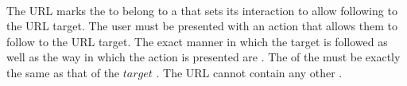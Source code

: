  \\

The URL  marks the  to belong to a  that sets its interaction to allow following to the URL target. The user must be presented with an action that allows them to follow to the URL target. The exact manner in which the target is followed as well as the way in which the action is presented are . The  of the  must be exactly the same as that of the \inline$target$ . The URL  cannot contain any other .\\

\begin{examples}
\end{examples}

